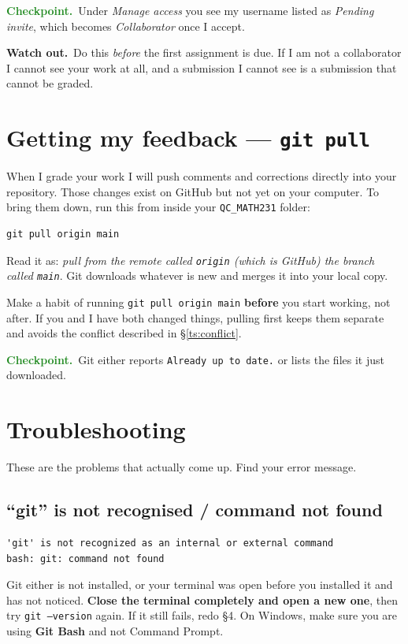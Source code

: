 \documentclass[11pt]{article}
\newcommand{\checkpoint}[1]{\par\smallskip\noindent
  {\small\sffamily\textcolor{ForestGreen}{\textbf{Checkpoint.}}\ #1}\par\smallskip}
\newcommand{\heads}[1]{\par\smallskip\noindent
  {\small\sffamily\textcolor{BrickRed}{\textbf{Watch out.}}\ #1}\par\smallskip}
\newcommand{\repname}{QC\_MATH231}
\begin{document}
\checkpoint{Under \emph{Manage access} you see my username listed as
\emph{Pending invite}, which becomes \emph{Collaborator} once I accept.}

\heads{Do this \emph{before} the first assignment is due. If I am not a
collaborator I cannot see your work at all, and a submission I cannot see is a
submission that cannot be graded.}

\section{Getting my feedback --- \texttt{git pull}}\label{sec:pull}
When I grade your work I will push comments and corrections directly into your
repository. Those changes exist on GitHub but not yet on your computer. To bring
them down, run this from inside your \texttt{\repname} folder:

\begin{lstlisting}
git pull origin main
\end{lstlisting}

\noindent Read it as: \emph{pull from the remote called \texttt{origin} (which
is GitHub) the branch called \texttt{main}}. Git downloads whatever is new and
merges it into your local copy.

\medskip
\noindent Make a habit of running \texttt{git pull origin main} \textbf{before}
you start working, not after. If you and I have both changed things, pulling
first keeps them separate and avoids the conflict described in
\S\ref{ts:conflict}.

\checkpoint{Git either reports \texttt{Already up to date.} or lists the files
it just downloaded.}

\section{Troubleshooting}\label{sec:trouble}
These are the problems that actually come up. Find your error message.

\subsection{``git'' is not recognised / command not found}
\begin{lstlisting}
'git' is not recognized as an internal or external command
bash: git: command not found
\end{lstlisting}
Git either is not installed, or your terminal was open before you installed it
and has not noticed. \textbf{Close the terminal completely and open a new one},
then try \texttt{git --version} again. If it still fails, redo \S4. On Windows,
make sure you are using \textbf{Git Bash} and not Command Prompt.
\end{document}

